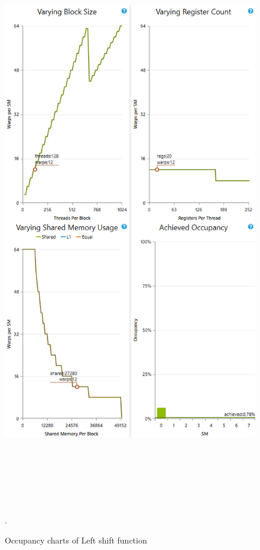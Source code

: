 \documentclass[oneside,openright,12pt,final,en]{mgr}
\begin{document}
\begin{figure}[H]
	\centering
	\includegraphics[width=\textwidth, height=26cm,keepaspectratio]{leftshift_occupancy_charts}.
	\caption{Occupancy charts of Left shift function}
	\label{fig:leftshift_occupancy_charts}
\end{figure}
\end{document}
